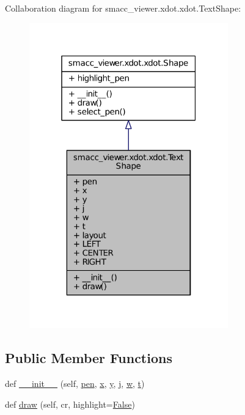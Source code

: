 Collaboration diagram for smacc\+\_\+viewer.\+xdot.\+xdot.\+Text\+Shape\+:
\nopagebreak
\begin{figure}[H]
\begin{center}
\leavevmode
\includegraphics[width=244pt]{classsmacc__viewer_1_1xdot_1_1xdot_1_1TextShape__coll__graph}
\end{center}
\end{figure}
\subsection*{Public Member Functions}
\begin{DoxyCompactItemize}
\item 
def \hyperlink{classsmacc__viewer_1_1xdot_1_1xdot_1_1TextShape_af80754ec67d63bb9b6481323b5c0ad73}{\+\_\+\+\_\+init\+\_\+\+\_\+} (self, \hyperlink{classsmacc__viewer_1_1xdot_1_1xdot_1_1TextShape_a1b3b342bfa195afb19513d331bc67ebe}{pen}, \hyperlink{classsmacc__viewer_1_1xdot_1_1xdot_1_1TextShape_adb71cfa0675b497482fbcfcf02149ce0}{x}, \hyperlink{classsmacc__viewer_1_1xdot_1_1xdot_1_1TextShape_aeb3fc97ee8f5cdf716d9b02f09e1e2bd}{y}, \hyperlink{classsmacc__viewer_1_1xdot_1_1xdot_1_1TextShape_ad30fd393e29daaba5d821ebf218e87b4}{j}, \hyperlink{classsmacc__viewer_1_1xdot_1_1xdot_1_1TextShape_a7d5700693374eef8389975e2f1f8f849}{w}, \hyperlink{classsmacc__viewer_1_1xdot_1_1xdot_1_1TextShape_a4cf31f74ca22cecf522c155199204abb}{t})
\item 
def \hyperlink{classsmacc__viewer_1_1xdot_1_1xdot_1_1TextShape_ac53196344e8e2cfe46da24419aed0397}{draw} (self, cr, highlight=\hyperlink{namespacesmacc__viewer_a5928e8da279785cbab9011356c3eaa87}{False})
\end{DoxyCompactItemize}
